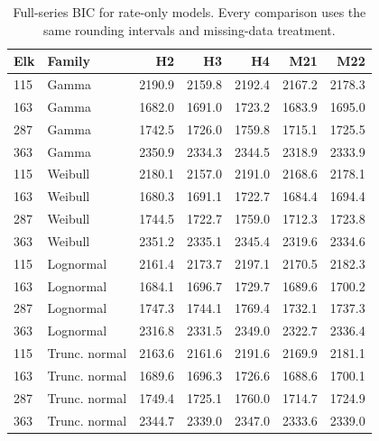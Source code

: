 \begin{table}[tbp]
\centering\small
\caption{Full-series BIC for rate-only models. Every comparison uses the same rounding intervals and missing-data treatment.}
\label{tab:movement-rate}
\begin{tabular}{llrrrrr}
\toprule
Elk & Family & H2 & H3 & H4 & M21 & M22 \\
\midrule
115 & Gamma & 2190.9 & 2159.8 & 2192.4 & 2167.2 & 2178.3 \\
163 & Gamma & 1682.0 & 1691.0 & 1723.2 & 1683.9 & 1695.0 \\
287 & Gamma & 1742.5 & 1726.0 & 1759.8 & 1715.1 & 1725.5 \\
363 & Gamma & 2350.9 & 2334.3 & 2344.5 & 2318.9 & 2333.9 \\
115 & Weibull & 2180.1 & 2157.0 & 2191.0 & 2168.6 & 2178.1 \\
163 & Weibull & 1680.3 & 1691.1 & 1722.7 & 1684.4 & 1694.4 \\
287 & Weibull & 1744.5 & 1722.7 & 1759.0 & 1712.3 & 1723.8 \\
363 & Weibull & 2351.2 & 2335.1 & 2345.4 & 2319.6 & 2334.6 \\
115 & Lognormal & 2161.4 & 2173.7 & 2197.1 & 2170.5 & 2182.3 \\
163 & Lognormal & 1684.1 & 1696.7 & 1729.7 & 1689.6 & 1700.2 \\
287 & Lognormal & 1747.3 & 1744.1 & 1769.4 & 1732.1 & 1737.3 \\
363 & Lognormal & 2316.8 & 2331.5 & 2349.0 & 2322.7 & 2336.4 \\
115 & Trunc. normal & 2163.6 & 2161.6 & 2191.6 & 2169.9 & 2181.1 \\
163 & Trunc. normal & 1689.6 & 1696.3 & 1726.6 & 1688.6 & 1700.1 \\
287 & Trunc. normal & 1749.4 & 1725.1 & 1760.0 & 1714.7 & 1724.9 \\
363 & Trunc. normal & 2344.7 & 2339.0 & 2347.0 & 2333.6 & 2339.0 \\
\bottomrule
\end{tabular}
\end{table}
